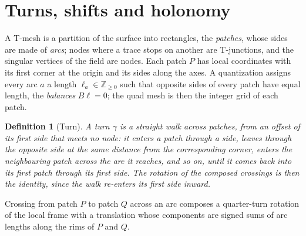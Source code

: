 \documentclass[11pt,a4paper]{article}
\newtheorem{definition}{Definition}
\newcommand{\Z}{\mathbb{Z}}
\begin{document}
\section{Turns, shifts and holonomy}\label{sec:setting}

A T-mesh is a partition of the surface into rectangles, the \emph{patches},
whose sides are made of \emph{arcs}; nodes where a trace stops on another are
T-junctions, and the singular vertices of the field are nodes. Each patch $P$
has local coordinates with its first corner at the origin and its sides along
the axes. A quantization assigns every arc $a$ a length $\ell_a \in \Z_{\ge
0}$ such that opposite sides of every patch have equal length, the
\emph{balances} $B\ell = 0$; the quad mesh is then the integer grid of each
patch.

\begin{definition}[Turn]
A \emph{turn} $\gamma$ is a straight walk across patches, from an offset of
its first side that meets no node: it enters a patch through a side, leaves
through the opposite side at the same distance from the corresponding corner,
enters the neighbouring patch across the arc it reaches, and so on, until it
comes back into its first patch through its first side. The rotation of the
composed crossings is then the identity, since the walk re-enters its first
side inward.
\end{definition}

Crossing from patch $P$ to patch $Q$ across an arc composes a quarter-turn
rotation of the local frame with a translation whose components are signed
sums of arc lengths along the rims of $P$ and $Q$.
\end{document}
